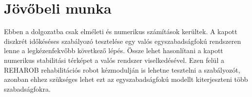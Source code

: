 \chapter{Jövőbeli munka}\label{chap:conclusion}

Ebben a dolgozatba csak elméleti és numerikus számítások kerültek. A kapott 
diszkrét időkéséses szabályozó tesztelése egy valós egyszabadságfokú rendszeren 
lenne a legkézenfekvőbb következő lépés. Össze lehet hasonlítani a kapott 
numerikus stabilitási térképet a valós rendszer viselkedésével. Ezen felül 
a REHAROB rehabilitációs robot kézmodulján is lehetne tesztelni a szabályozót, azonban 
ehhez szükséges lehet ezt az egyszabadságfokú modellt kiterjeszteni több szabadságfokra.